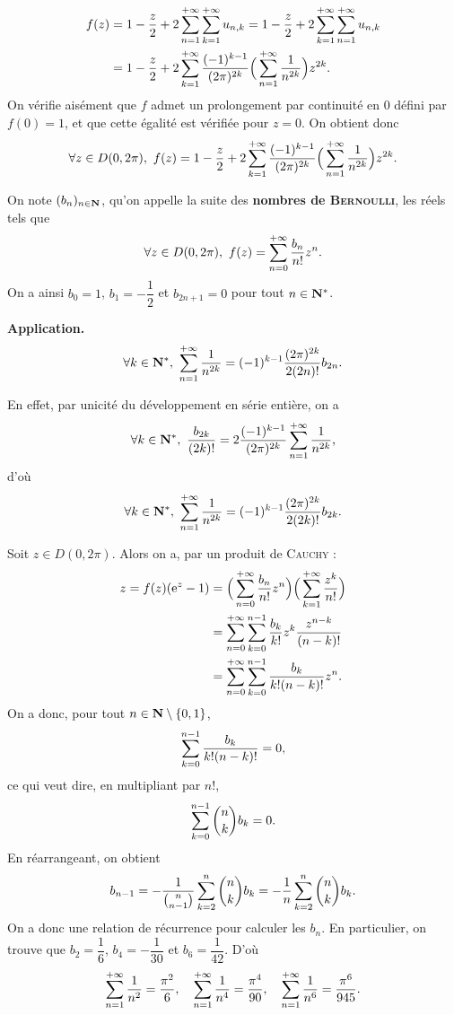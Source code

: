 \documentclass[ikea]{../ceri/sty/MasterArticle}
\begin{document}
\begin{demo}
    \begin{align*}
        f(z) & = 1 -\frac z2 + 2\sum_{n=1}^{+\infty}\sum_{k=1}^{+\infty}u_{n,k} = 1 -\frac z2 + 2\sum_{k=1}^{+\infty}\sum_{n=1}^{+\infty}u_{n,k} \\
             & = 1 - \frac z2 + 2\sum_{k=1}^{+\infty}\frac{(-1)^{k-1}}{(2\pi)^{2k}}\Big(\sum_{n=1}^{+\infty}\frac 1{n^{2k}}\Big)z^{2k}\text.
    \end{align*}
    On vérifie aisément que $f$ admet un prolongement par continuité en $0$ défini par $f(0)=1$, et que cette égalité est vérifiée pour $z=0$. On obtient donc
    \[ \forall z\in D(0,2\pi),\ f(z) = 1 - \frac z2 + 2\sum_{k=1}^{+\infty}\frac{(-1)^{k-1}}{(2\pi)^{2k}}\Big(\sum_{n=1}^{+\infty}\frac 1{n^{2k}}\Big)z^{2k}\text. \]
\end{demo}

On note $(b_n)_{n\in\mathbf{N}}$, qu'on appelle la suite des \textbf{nombres de \textsc{Bernoulli}}, les réels tels que
\[ \forall z\in D(0,2\pi),\ f(z) = \sum_{n=0}^{+\infty}\frac{b_n}{n!}z^n\text. \]
On a ainsi $b_0=1$, $b_1=-\dfrac 12$ et $b_{2n+1}=0$ pour tout $n\in\mathbf{N}^*$.

\textbf{Application.}
\[ \forall k\in\mathbf{N}^*,\ \sum_{n=1}^{+\infty}\frac 1{n^{2k}} = (-1)^{k-1}\frac{(2\pi)^{2k}}{2(2n)!}b_{2n}\text. \]

\begin{demo}
    En effet, par unicité du développement en série entière, on a
    \[ \forall k\in\mathbf{N}^*,\ \frac{b_{2k}}{(2k)!} = 2\frac{(-1)^{k-1}}{(2\pi)^{2k}}\sum_{n=1}^{+\infty}\frac 1{n^{2k}}\text, \]
    d'où
    \[ \forall k\in\mathbf{N}^*,\ \sum_{n=1}^{+\infty}\frac 1{n^{2k}} = (-1)^{k-1}\frac{(2\pi)^{2k}}{2(2k)!}b_{2k}\text. \]
\end{demo}

Soit $z\in D(0,2\pi)$. Alors on a, par un produit de \textsc{Cauchy} :
\begin{align*}
    z = f(z)(\mathrm{e}^z-1) & = \Big( \sum_{n=0}^{+\infty}\frac{b_n}{n!}z^n \Big)\Big(\sum_{k=1}^{+\infty}\frac{z^k}{n!}\Big) \\
                     & = \sum_{n=0}^{+\infty}\sum_{k=0}^{n-1}\frac{b_k}{k!}z^k\frac{z^{n-k}}{(n-k)!}                   \\
                     & = \sum_{n=0}^{+\infty}\sum_{k=0}^{n-1}\frac{b_k}{k!(n-k)!}z^n\text.
\end{align*}
On a donc, pour tout $n\in\mathbf{N}\setminus\{0,1\}$,
\[ \sum_{k=0}^{n-1}\frac{b_k}{k!(n-k)!} = 0\text, \]
ce qui veut dire, en multipliant par $n!$,
\[ \sum_{k=0}^{n-1}\binom nk b_k = 0\text. \]
En réarrangeant, on obtient
\[ b_{n-1} = -\frac 1{\binom n{n-1}}\sum_{k=2}^n\binom nk b_k =  -\frac 1{n}\sum_{k=2}^n\binom nk b_k\text. \]
On a donc une relation de récurrence pour calculer les $b_n$. En particulier, on trouve que $b_2 = \dfrac 16$, $b_4=-\dfrac 1{30}$ et $b_6=\dfrac 1{42}$. D'où
\[ \sum_{n=1}^{+\infty}\frac 1{n^{2}} = \frac{\pi^2}6,\quad\sum_{n=1}^{+\infty}\frac 1{n^{4}} = \frac{\pi^4}{90},\quad\sum_{n=1}^{+\infty}\frac 1{n^{6}} = \frac{\pi^6}{945}\text.  \]

\printbibliography
\end{document}
